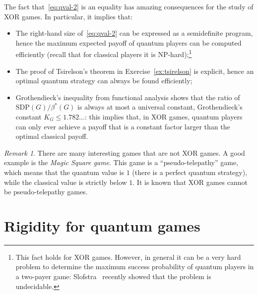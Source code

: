 \documentclass{report}
\theoremstyle{plain}
\theoremstyle{definition}
\theoremstyle{remark}
\newtheorem{remark}[subsection]{Remark}
\numberwithin{equation}{subsection}
\begin{document}
The fact that~\eqref{eq:qval-2} is an equality has amazing consequences for the study of XOR games. In particular, it implies that: 
\begin{itemize}
  \item The right-hand size of~\eqref{eq:qval-2} can be expressed as a semidefinite program, hence the maximum expected payoff of quantum players can be computed efficiently (recall that for classical players it is NP-hard);\footnote{This fact holds for XOR games. However, in general it can be a very hard problem to determine the maximum success probability of quantum players in a two-payer game: Slofstra~\cite{slofstra2017set} recently showed that the problem is undecidable.}
  \item The proof of Tsirelson's theorem in Exercise~\ref{ex:tsirelson} is explicit, hence an optimal quantum strategy can always be found efficiently;
  \item Grothendieck's inequality from functional analysis shows that the ratio of $\text{SDP}(G)/\beta^*(G)$ is always at most a universal constant, Grothendieck's constant $K_G \leq 1.782\ldots$: this implies that, in XOR games, quantum players can only ever achieve a payoff that is a constant factor larger than the optimal classical payoff.
\end{itemize}

\begin{remark}
There are many interesting games that are not XOR games. A good example is the \emph{Magic Square game}. This game is a ``pseudo-telepathy'' game, which means that the quantum value is $1$ (there is a perfect quantum strategy), while the classical value is strictly below $1$. It is known that XOR games cannot be pseudo-telepathy games. 
\end{remark}

\chapter{Rigidity for quantum games}
\label{chapter:rigidity}
\end{document}
